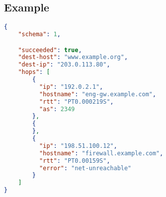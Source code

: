 \documentclass[10pt]{article}
\begin{document}
\subsection{Example}
\begin{lstlisting}[language=json]
{
    "schema": 1,

    "succeeded": true,
    "dest-host": "www.example.org",
    "dest-ip": "203.0.113.80",
    "hops": [
        {
          "ip": "192.0.2.1",
          "hostname": "eng-gw.example.com",
          "rtt": "PT0.000219S",
          "as": 2349
        },
        {
        },
        {
          "ip": "198.51.100.12",
          "hostname": "firewall.example.com",
          "rtt": "PT0.00159S",
          "error": "net-unreachable"
        }
    ]
}
\end{lstlisting}
\end{document}
